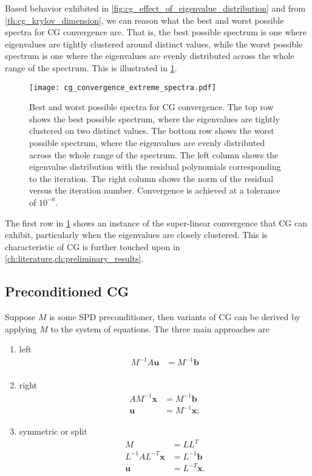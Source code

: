 Based behavior exhibited in \cref{fig:cg_effect_of_eigenvalue_distribution} and from \cref{th:cg_krylov_dimension}, we can reason what the best and worst possible spectra for CG convergence are. That is, the best possible spectrum is one where eigenvalues are tightly clustered around distinct values, while the worst possible spectrum is one where the eigenvalues are evenly distributed across the whole range of the spectrum. This is illustrated in \cref{fig:cg_best_worst_spectra}.
\begin{figure}[H]
  \centering
  \texttt{[image: cg\_convergence\_extreme\_spectra.pdf]}
  \caption{Best and worst possible spectra for CG convergence. The top row shows the best possible spectrum, where the eigenvalues are tightly clustered on two distinct values. The bottom row shows the worst possible spectrum, where the eigenvalues are evenly distributed across the whole range of the spectrum. The left column shows the eigenvalue distribution with the residual polynomials corresponding to the iteration. The right column shows the norm of the residual versus the iteration number. Convergence is achieved at a tolerance of $10^{-6}$.}
  \label{fig:cg_best_worst_spectra}
\end{figure}
The first row in \cref{fig:cg_best_worst_spectra} shows an instance of the super-linear convergence that CG can exhibit, particularly when the eigenvalues are closely clustered. This is characteristic of CG is further touched upon in \cref{ch:literature,ch:preliminary_results}.

\subsection{Preconditioned CG} \label{sec:cg_preconditioning}
Suppose $M$ is some SPD preconditioner, then variants of CG can be derived by applying $M$ to the system of equations. The three main approaches are
\begin{enumerate}[label=\textbf{PCG-\arabic*},ref=\textbf{PCG-type \arabic*},leftmargin=1.25cm]
  \item\label{pcg_type:left} left
  \begin{align*}
    M^{-1}A\mathbf{u} & = M^{-1}\mathbf{b} \\
  \end{align*}
  \item\label{pcg_type:right} right
  \begin{align*}
    AM^{-1}\mathbf{x} & = M^{-1}\mathbf{b}  \\
    \mathbf{u}        & = M^{-1}\mathbf{x};
  \end{align*}
  \item\label{pcg_type:symmetric} symmetric or split
  \begin{align*}
    M                       & = LL^T              \\
    L^{-1}AL^{-T}\mathbf{x} & = L^{-1}\mathbf{b}  \\
    \mathbf{u}              & = L^{-T}\mathbf{x}. \\
  \end{align*}
\end{enumerate}

